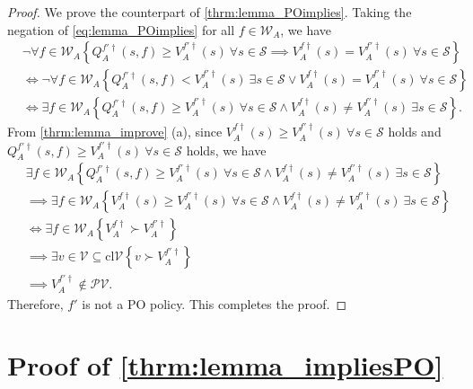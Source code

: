 \documentclass{acml}
\begin{document}
\begin{proof}
	We prove the counterpart of \cref{thrm:lemma_POimplies}.
	Taking the negation of \cref{eq:lemma_POimplies} for all $f\in \mathcal{W}_A$, we have
	\begin{subequations}
		\begin{align}
			&\neg\forall f\in\mathcal{W}_A\left\{ Q_A^{f'\dag}(s,f)\ge V_A^{f'\dag}(s)~\forall s\in\mathcal{S}\implies V_A^{f\dag}(s)=V_A^{f'\dag}(s)~\forall s\in\mathcal{S} \right\}\nonumber\\
			&\iff \neg \forall f\in \mathcal{W}_A \left\{ Q_A^{f'\dag}(s,f)<V_A^{f'\dag}(s)~\exists s\in\mathcal{S}\lor V_A^{f\dag}(s)=V_A^{f'\dag}(s)~\forall s\in\mathcal{S} \right\}\\
			&\iff \exists f\in \mathcal{W}_A \left\{ Q_A^{f'\dag}(s,f)\ge V_A^{f'\dag}(s)~\forall s\in\mathcal{S}\land V_A^{f\dag}(s)\neq V_A^{f'\dag}(s)~\exists s\in\mathcal{S} \right\}.
		\end{align}
	\end{subequations}
	From \cref{thrm:lemma_improve} (a), since $V_A^{f\dag}(s)\ge V_A^{f'\dag}(s)~\forall s\in\mathcal{S}$ holds and $Q_A^{f'\dag}(s,f)\ge V_A^{f'\dag}(s)~\forall s\in\mathcal{S}$ holds, we have
	\begin{align}
		&\exists f\in \mathcal{W}_A \left\{ Q_A^{f'\dag}(s,f)\ge V_A^{f'\dag}(s)~\forall s\in\mathcal{S}\land V_A^{f\dag}(s)\neq V_A^{f'\dag}(s)~\exists s\in\mathcal{S} \right\}\nonumber\\
		&\implies \exists f\in \mathcal{W}_A \left\{ V_A^{f\dag}(s)\ge V_A^{f'\dag}(s)~\forall s\in\mathcal{S}\land V_A^{f\dag}(s)\neq V_A^{f'\dag}(s)~\exists s\in\mathcal{S} \right\}
		\\
		&\iff \exists f\in \mathcal{W}_A \left\{ V_A^{f\dag} \succ V_A^{f'\dag} \right\}
		\\
		&\implies \exists v\in \mathcal{V} \subseteq \mathrm{cl}\mathcal{V} \left\{ v \succ V_A^{f'\dag} \right\}
		\\
		&\implies V_A^{f'\dag} \notin \mathcal{PV}.
	\end{align}
	Therefore, $f'$ is not a PO policy. This completes the proof.
\end{proof}

\section{Proof of \texorpdfstring{\cref{thrm:lemma_impliesPO}}{Lg}}\label{apdx:lemma_impliesPO}
\end{document}
